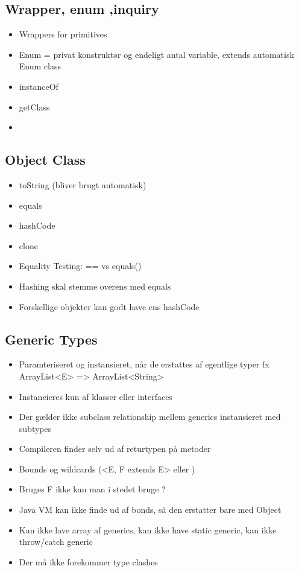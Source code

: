 \subsection{Wrapper, enum ,inquiry} %
\label{sub:wrapper_enum_inquiry}
\begin{itemize}
    \item Wrappers for primitives
    \item Enum = privat konstruktør og endeligt antal variable, extends automatisk Enum class
    \item instanceOf
    \item getClass
    \item
\end{itemize}
\subsection{Object Class} %
\label{sub:object_class}
\begin{itemize}
    \item toString (bliver brugt automatisk)
    \item equals
    \item hashCode
    \item clone
    \item Equality Testing: == vs equals()
    \item Hashing skal stemme overens med equals
    \item Forskellige objekter kan godt have ens hashCode
\end{itemize}
\subsection{Generic Types} %
\label{sub:generic_types}
\begin{itemize}
    \item Paramteriseret og instansieret, når de erstattes af egentlige typer fx ArrayList<E> => ArrayList<String>
    \item Instancieres kun af klasser eller interfaces
    \item Der gælder ikke subclass relationship mellem generics instansieret med subtypes
    \item Compileren finder selv ud af returtypen på metoder
    \item Bounds og wildcards (<E, F extends E> eller )
    \item Bruges F ikke kan man i stedet bruge ?
    \item Java VM kan ikke finde ud af bonds, så den erstatter bare med Object
    \item Kan ikke lave array af generics, kan ikke have static generic, kan ikke throw/catch generic
    \item Der må ikke forekommer type clashes
\end{itemize}
\newpage
